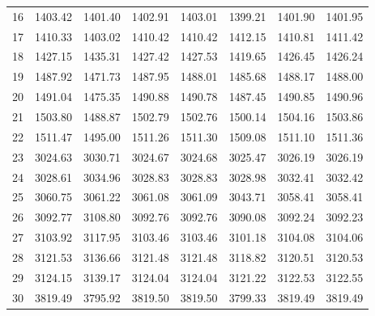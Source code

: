 \documentclass[10pt,oneside]{article}
\begin{document}
\begin{table}[h!]
\begin{tabular}{cccccccc}
16 &   1403.42 & 1401.40 & 1402.91 & 1403.01 &      1399.21 & 1401.90 & 1401.95 \\
17 &   1410.33 & 1403.02 & 1410.42 & 1410.42 &      1412.15 & 1410.81 & 1411.42 \\
18 &   1427.15 & 1435.31 & 1427.42 & 1427.53 &      1419.65 & 1426.45 & 1426.24 \\
19 &   1487.92 & 1471.73 & 1487.95 & 1488.01 &      1485.68 & 1488.17 & 1488.00 \\
20 &   1491.04 & 1475.35 & 1490.88 & 1490.78 &      1487.45 & 1490.85 & 1490.96 \\
21 &   1503.80 & 1488.87 & 1502.79 & 1502.76 &      1500.14 & 1504.16 & 1503.86 \\
22 &   1511.47 & 1495.00 & 1511.26 & 1511.30 &      1509.08 & 1511.10 & 1511.36 \\
23 &   3024.63 & 3030.71 & 3024.67 & 3024.68 &      3025.47 & 3026.19 & 3026.19 \\
24 &   3028.61 & 3034.96 & 3028.83 & 3028.83 &      3028.98 & 3032.41 & 3032.42 \\
25 &   3060.75 & 3061.22 & 3061.08 & 3061.09 &      3043.71 & 3058.41 & 3058.41 \\
26 &   3092.77 & 3108.80 & 3092.76 & 3092.76 &      3090.08 & 3092.24 & 3092.23 \\
27 &   3103.92 & 3117.95 & 3103.46 & 3103.46 &      3101.18 & 3104.08 & 3104.06 \\
28 &   3121.53 & 3136.66 & 3121.48 & 3121.48 &      3118.82 & 3120.51 & 3120.53 \\
29 &   3124.15 & 3139.17 & 3124.04 & 3124.04 &      3121.22 & 3122.53 & 3122.55 \\
30 &   3819.49 & 3795.92 & 3819.50 & 3819.50 &      3799.33 & 3819.49 & 3819.49 \\
\bottomrule
\end{tabular}
\end{table}

\clearpage
\end{document}
